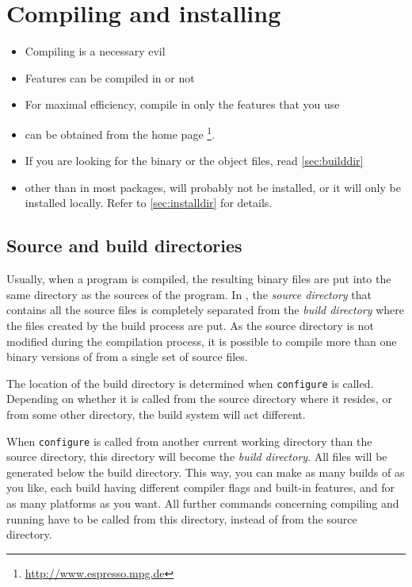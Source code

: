 \chapter{Compiling and installing \es}
\label{chap:install}

\begin{itemize}
\item Compiling \es{} is a necessary evil
\item Features can be compiled in or not
\item For maximal efficiency, compile in only the features that you
  use
\item \es{} can be obtained from the \es{} home page
  \footnote{\url{http://www.espresso.mpg.de}}.
\item If you are looking for the \es binary or the object files, read
  \vref{sec:builddir}
\item other than in most packages, \es will probably not be installed,
  or it will only be installed locally. Refer to \vref{sec:installdir}
  for details.
\end{itemize}

\section{Source and build directories}
\label{sec:builddir}
 

Usually, when a program is compiled, the resulting binary files are
put into the same directory as the sources of the program. In \es, the
\emph{source directory} that contains all the source files is
completely separated from the \emph{build directory} where the files
created by the build process are put. As the source directory is not
modified during the compilation process, it is possible to compile more
than one binary versions of \es from a single set of source files.

The location of the build directory is determined when
\texttt{configure} is called.  Depending on whether it is called from
the source directory where it resides, or from some other directory,
the build system will act different.

When \texttt{configure} is called from another current working
directory than the source directory, this directory will become the
\emph{build directory}.  All files will be generated below the build
directory.  This way, you can make as many builds of \es as you like,
each build having different compiler flags and built-in features, and
for as many platforms as you want.  All further commands concerning
compiling and running \es{} have to be called from this directory,
instead of from the source directory.

